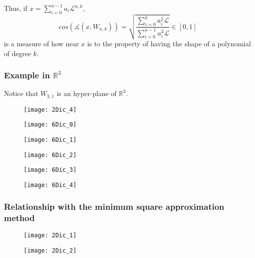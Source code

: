 \documentclass[]{beamer}
\theoremstyle{definition}
\newcommand{\IR}{\mathbb{R}}
\newcommand{\suma}[3]{\sum\limits_{#1}^{#2}#3} %
\newcommand{\cali}[1]{\mathcal{#1}} %
\begin{document}
\begin{frame}
Thus, if $x = \suma{i=0}{n-1}{a_{i} \cali{L}^{n,k}}$,
\[
cos(\measuredangle(x, W_{n,k})) = \sqrt{
\frac{
\suma{i=0}{k}{a_{i}^{2} \cali{L}}
}{
\suma{i=0}{n-1}{a_{i}^{2} \cali{L}}}
} \in [0,1]
\]
is a measure of how near $x$ is to the property of having the
shape of a polynomial of degree $k$.
\end{frame}



\begin{frame}
\frametitle{Example in $\IR^{3}$}
Notice that $W_{3,1}$ is an hyper-plane of $\IR^{3}$.
\begin{figure}[h]
\texttt{[image: 2Dic\_4]}
\end{figure}
\end{frame}

\begin{frame}
\begin{figure}[h]
\texttt{[image: 6Dic\_0]}
\end{figure}
\end{frame}

\begin{frame}
\begin{figure}[h]
\texttt{[image: 6Dic\_1]}
\end{figure}
\end{frame}

\begin{frame}
\begin{figure}[h]
\texttt{[image: 6Dic\_2]}
\end{figure}
\end{frame}

\begin{frame}
\begin{figure}[h]
\texttt{[image: 6Dic\_3]}
\end{figure}
\end{frame}

\begin{frame}
\begin{figure}[h]
\texttt{[image: 6Dic\_4]}
\end{figure}
\end{frame}


\begin{frame}
\frametitle{Relationship with the minimum square approximation method}

\begin{figure}[h]
\texttt{[image: 2Dic\_1]}
\end{figure}

\begin{figure}[h]
\texttt{[image: 2Dic\_2]}
\end{figure}

\end{frame}
\end{document}
